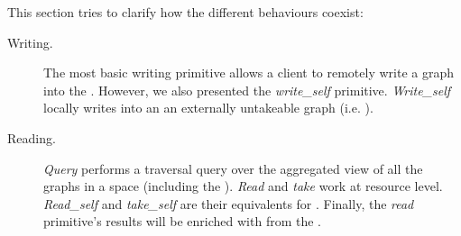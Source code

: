This section tries to clarify how the different behaviours coexist:

\begin{description}
 \item[Writing.]
      The most basic writing primitive allows a client to remotely write a graph into the \coordspace{}.
      However, we also presented the \emph{write\_self} primitive.
      \emph{Write\_self} locally writes into an \asteroid{} an externally untakeable graph (i.e. \selfgraphs{}).
 \item[Reading.]
      \emph{Query} performs a traversal query over the aggregated view of all the graphs in a space (including the \selfgraphs{}).
      \emph{Read} and \emph{take} work at resource level.
      \emph{Read\_self} and \emph{take\_self} are their equivalents for \selfgraphs{}.
      Finally, the \emph{read} primitive's results will be enriched with \selfgraphs{} from the \outerspace{}. %
\end{description}
